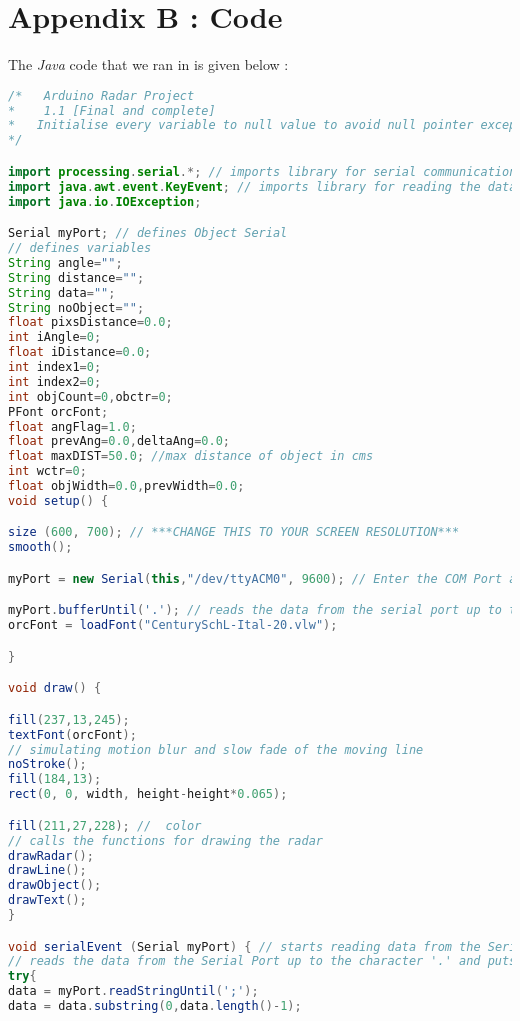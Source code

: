 \chapter{Appendix B : \processing{} Code}\label{ch:appBlabel}
The \emph{Java} code that we ran in \processing{} is given below :
\begin{mdframed}[backgroundcolor=light-gray, roundcorner=10pt,leftmargin=1, rightmargin=1, innerleftmargin=15, innertopmargin=15,innerbottommargin=15, outerlinewidth=1, linecolor=light-gray]
\begin{lstlisting}[caption={The Processing Code}, language=Java]
/*   Arduino Radar Project
*    1.1 [Final and complete]
*   Initialise every variable to null value to avoid null pointer exception
*/

import processing.serial.*; // imports library for serial communication
import java.awt.event.KeyEvent; // imports library for reading the data from the serial port
import java.io.IOException;

Serial myPort; // defines Object Serial
// defines variables
String angle="";
String distance="";
String data="";
String noObject="";
float pixsDistance=0.0;
int iAngle=0;
float iDistance=0.0;
int index1=0;
int index2=0;
int objCount=0,obctr=0;
PFont orcFont;
float angFlag=1.0;
float prevAng=0.0,deltaAng=0.0;
float maxDIST=50.0; //max distance of object in cms
int wctr=0;
float objWidth=0.0,prevWidth=0.0;
void setup() {

size (600, 700); // ***CHANGE THIS TO YOUR SCREEN RESOLUTION***
smooth();

myPort = new Serial(this,"/dev/ttyACM0", 9600); // Enter the COM Port address as COM4 or COM 22.starts the serial communication

myPort.bufferUntil('.'); // reads the data from the serial port up to the character '.'. So actually it reads this: angle,distance.
orcFont = loadFont("CenturySchL-Ital-20.vlw");

}

void draw() {

fill(237,13,245);
textFont(orcFont);
// simulating motion blur and slow fade of the moving line
noStroke();
fill(184,13); 
rect(0, 0, width, height-height*0.065); 

fill(211,27,228); //  color
// calls the functions for drawing the radar
drawRadar(); 
drawLine();
drawObject();
drawText();
}

void serialEvent (Serial myPort) { // starts reading data from the Serial Port
// reads the data from the Serial Port up to the character '.' and puts it into the String variable "data".
try{
data = myPort.readStringUntil(';');
data = data.substring(0,data.length()-1);


\end{lstlisting}
\end{mdframed}
